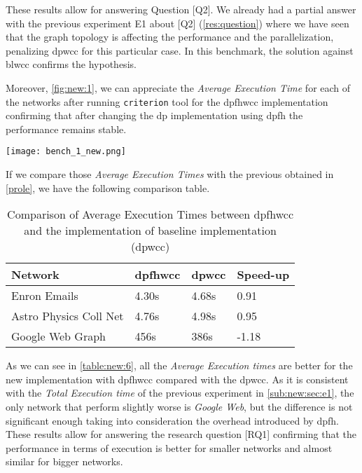 These results allow for answering Question [Q2].
We already had a partial answer with the previous experiment E1 about [Q2] (\autoref{res:question}) where we have seen that the graph topology is affecting the performance and the parallelization, penalizing \acrshort{dpwcc} for this particular case. 
In this benchmark, the solution against \acrshort{blwcc} confirms the hypothesis. 

Moreover, \autoref{fig:new:1}, we can appreciate the \textit{Average Execution Time} for each of the networks after running \texttt{criterion} tool for the \acrshort{dpfhwcc} implementation confirming that after changing the \acrshort{dp} implementation using \acrshort{dpfh} the performance remains stable.

\begin{minipage}[t]{\linewidth}
  \texttt{[image: bench\_1\_new.png]}
  \captionsetup{type=figure}
  \label{fig:new:1}
\end{minipage}

If we compare those \textit{Average Execution Times} with the previous obtained in \autoref{prole}, we have the following comparison table.

 \begin{table}[H]
  \centering
  \begin{tabular}{|l|l|l|l|}
   \hline
   \textbf{Network} & \textbf{\acrshort{dpfhwcc}} & \textbf{\acrshort{dpwcc}} & \textbf{Speed-up}\\
   \hline
   Enron Emails & 4.30s & 4.68s &  0.91\\
   \hline
   Astro Physics Coll Net & 4.76s  & 4.98s & 0.95\\
   \hline
   Google Web Graph & 456s & 386s & -1.18\\
   \hline
  \end{tabular}
 \caption{Comparison of Average Execution Times between \acrshort{dpfhwcc} and the implementation of baseline implementation (\acrshort{dpwcc})}
 \label{table:new:6}
 \end{table}

As we can see in \autoref{table:new:6}, all the \textit{Average Execution times} are better for the new implementation with \acrshort{dpfhwcc} compared with the \acrshort{dpwcc}.
As it is consistent with the \textit{Total Execution time} of the previous experiment in \autoref{sub:new:sec:e1}, the only network that perform slightly worse is \textit{Google Web}, but the difference is not significant enough taking into consideration the overhead introduced by \acrshort{dpfh}.
These results allow for answering the research question [RQ1] confirming that the performance in terms of execution is better for smaller networks and almost similar for bigger networks. 


